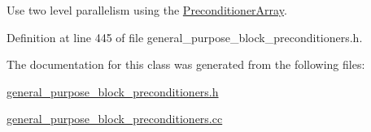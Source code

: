 Use two level parallelism using the \hyperlink{classoomph_1_1PreconditionerArray}{Preconditioner\+Array}. 



Definition at line 445 of file general\+\_\+purpose\+\_\+block\+\_\+preconditioners.\+h.



The documentation for this class was generated from the following files\+:\begin{DoxyCompactItemize}
\item 
\hyperlink{general__purpose__block__preconditioners_8h}{general\+\_\+purpose\+\_\+block\+\_\+preconditioners.\+h}\item 
\hyperlink{general__purpose__block__preconditioners_8cc}{general\+\_\+purpose\+\_\+block\+\_\+preconditioners.\+cc}\end{DoxyCompactItemize}
